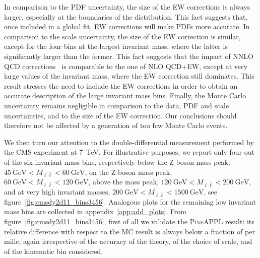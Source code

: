 In comparison to the PDF uncertainty, the size of the EW corrections is
always larger, especially at the boundaries of the distribution. This fact
suggests that, once included in a global fit, EW corrections will make PDFs
more accurate. In comparison to the scale
uncertainty, the size of the EW correction is similar, except for the four bins
at the largest invariant mass, where the latter is significantly larger than
the former. This fact suggests that the impact of NNLO QCD corrections~\cite{Anastasiou:2003yy,Catani:2009sm,Gavin:2010az,Li:2012wna,Boughezal:2016wmq} is comparable
to the one of NLO QCD+EW, except at very large values of the invariant mass,
where the EW correction still dominates. This result stresses the need to
include the EW corrections in order to obtain an accurate description of the
large invariant mass bins. Finally, the Monte Carlo 
uncertainty remains negligible in comparison to the data, PDF and scale
uncertainties, and to the size of the EW correction. Our conclusions should
therefore not be affected by a generation of too few Monte Carlo events.

We then turn our attention to the double-differential measurement performed by
the CMS experiment at \SI{7}{\tera\electronvolt}. For illustrative purposes, we report only four out
of the six invariant mass bins, respectively below the Z-boson mass peak,
$\SI{45}{\giga\electronvolt}<M_{\ell\bar\ell}<\SI{60}{\giga\electronvolt}$, on the Z-boson mass peak,
$\SI{60}{\giga\electronvolt}<M_{\ell\bar\ell}<\SI{120}{\giga\electronvolt}$, above the mass peak,
$\SI{120}{\giga\electronvolt}<M_{\ell\bar\ell}<\SI{200}{\giga\electronvolt}$, and at very high invariant masses,
$\SI{200}{\giga\electronvolt}<M_{\ell\bar\ell}<\SI{1500}{\giga\electronvolt}$, see figure~\ref{fig:cmsdy2d11_bins3456}.
Analogous plots for the remaining low invariant mass bins are collected in
appendix~\ref{app:add_plots}. From figure~\ref{fig:cmsdy2d11_bins3456},
first of all we validate the \textsc{PineAPPL} result: its relative difference
with respect to the MC result is always below a fraction of per mille,
again irrespective of the accuracy of the theory, of the choice of scale, and
of the kinematic bin considered. 


